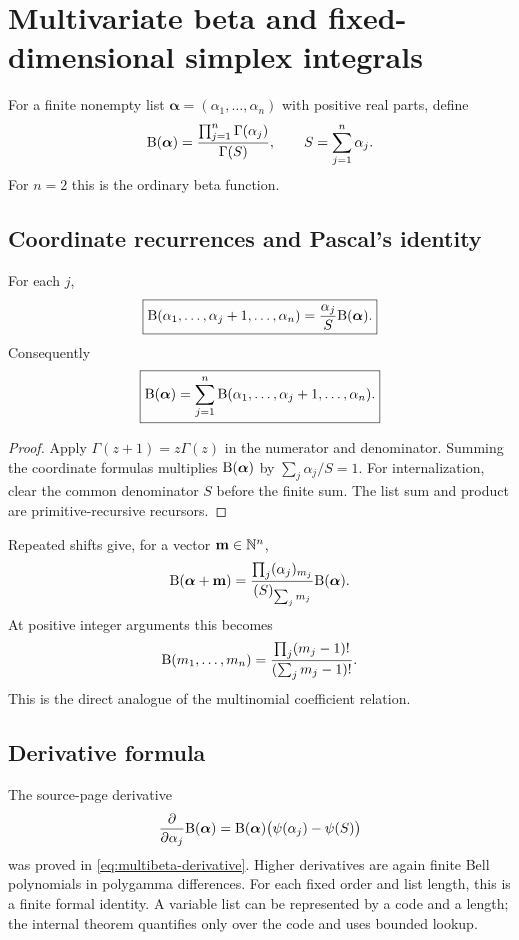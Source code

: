\section{Multivariate beta and fixed-dimensional simplex integrals}
\label{sec:multivariate}

For a finite nonempty list
$\boldsymbol\alpha=(\alpha_1,\ldots,\alpha_n)$ with positive real parts, define
\[
 \mathrm B(\boldsymbol\alpha)
 =\frac{\prod_{j=1}^{n}\Gamma(\alpha_j)}
        {\Gamma(S)},
 \qquad S=\sum_{j=1}^{n}\alpha_j.
\]
For $n=2$ this is the ordinary beta function.

\subsection{Coordinate recurrences and Pascal's identity}

\begin{theorem}\label{thm:multi-recurrence}
For each $j$,
\[
 \boxed{
 \mathrm B(\alpha_1,\ldots,\alpha_j+1,\ldots,\alpha_n)
 =\frac{\alpha_j}{S}\mathrm B(\boldsymbol\alpha).}
\]
Consequently
\[
 \boxed{
 \mathrm B(\boldsymbol\alpha)=
 \sum_{j=1}^{n}
 \mathrm B(\alpha_1,\ldots,\alpha_j+1,\ldots,\alpha_n).}
\]
\end{theorem}

\begin{proof}
Apply $\Gamma(z+1)=z\Gamma(z)$ in the numerator and denominator.  Summing the coordinate formulas multiplies $\mathrm B(\boldsymbol\alpha)$ by
$\sum_j\alpha_j/S=1$.  For internalization, clear the common denominator $S$ before the finite sum.  The list sum and product are primitive-recursive recursors.
\end{proof}

Repeated shifts give, for a vector $\mathbf m\in\mathbb N^n$,
\[
 \mathrm B(\boldsymbol\alpha+\mathbf m)
 =
 \frac{\prod_j(\alpha_j)_{m_j}}
      {(S)_{\sum_jm_j}}
 \mathrm B(\boldsymbol\alpha).
\]
At positive integer arguments this becomes
\[
 \mathrm B(m_1,\ldots,m_n)
 =\frac{\prod_j(m_j-1)!}
        {(\sum_jm_j-1)!}.
\]
This is the direct analogue of the multinomial coefficient relation.

\subsection{Derivative formula}

The source-page derivative
\[
 \frac{\partial}{\partial\alpha_j}\mathrm B(\boldsymbol\alpha)
 =
 \mathrm B(\boldsymbol\alpha)\bigl(\psi(\alpha_j)-\psi(S)\bigr)
\]
was proved in \eqref{eq:multibeta-derivative}.  Higher derivatives are again finite Bell polynomials in polygamma differences.  For each fixed order and list length, this is a finite formal identity.  A variable list can be represented by a code and a length; the internal theorem quantifies only over the code and uses bounded lookup.

